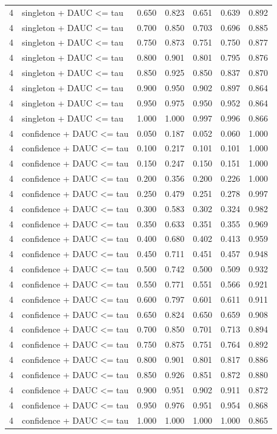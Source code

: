 \begin{tabular}{rlrrrrr}
4 & singleton + DAUC <= tau & 0.650 & 0.823 & 0.651 & 0.639 & 0.892 \\
4 & singleton + DAUC <= tau & 0.700 & 0.850 & 0.703 & 0.696 & 0.885 \\
4 & singleton + DAUC <= tau & 0.750 & 0.873 & 0.751 & 0.750 & 0.877 \\
4 & singleton + DAUC <= tau & 0.800 & 0.901 & 0.801 & 0.795 & 0.876 \\
4 & singleton + DAUC <= tau & 0.850 & 0.925 & 0.850 & 0.837 & 0.870 \\
4 & singleton + DAUC <= tau & 0.900 & 0.950 & 0.902 & 0.897 & 0.864 \\
4 & singleton + DAUC <= tau & 0.950 & 0.975 & 0.950 & 0.952 & 0.864 \\
4 & singleton + DAUC <= tau & 1.000 & 1.000 & 0.997 & 0.996 & 0.866 \\
4 & confidence + DAUC <= tau & 0.050 & 0.187 & 0.052 & 0.060 & 1.000 \\
4 & confidence + DAUC <= tau & 0.100 & 0.217 & 0.101 & 0.101 & 1.000 \\
4 & confidence + DAUC <= tau & 0.150 & 0.247 & 0.150 & 0.151 & 1.000 \\
4 & confidence + DAUC <= tau & 0.200 & 0.356 & 0.200 & 0.226 & 1.000 \\
4 & confidence + DAUC <= tau & 0.250 & 0.479 & 0.251 & 0.278 & 0.997 \\
4 & confidence + DAUC <= tau & 0.300 & 0.583 & 0.302 & 0.324 & 0.982 \\
4 & confidence + DAUC <= tau & 0.350 & 0.633 & 0.351 & 0.355 & 0.969 \\
4 & confidence + DAUC <= tau & 0.400 & 0.680 & 0.402 & 0.413 & 0.959 \\
4 & confidence + DAUC <= tau & 0.450 & 0.711 & 0.451 & 0.457 & 0.948 \\
4 & confidence + DAUC <= tau & 0.500 & 0.742 & 0.500 & 0.509 & 0.932 \\
4 & confidence + DAUC <= tau & 0.550 & 0.771 & 0.551 & 0.566 & 0.921 \\
4 & confidence + DAUC <= tau & 0.600 & 0.797 & 0.601 & 0.611 & 0.911 \\
4 & confidence + DAUC <= tau & 0.650 & 0.824 & 0.650 & 0.659 & 0.908 \\
4 & confidence + DAUC <= tau & 0.700 & 0.850 & 0.701 & 0.713 & 0.894 \\
4 & confidence + DAUC <= tau & 0.750 & 0.875 & 0.751 & 0.764 & 0.892 \\
4 & confidence + DAUC <= tau & 0.800 & 0.901 & 0.801 & 0.817 & 0.886 \\
4 & confidence + DAUC <= tau & 0.850 & 0.926 & 0.851 & 0.872 & 0.880 \\
4 & confidence + DAUC <= tau & 0.900 & 0.951 & 0.902 & 0.911 & 0.872 \\
4 & confidence + DAUC <= tau & 0.950 & 0.976 & 0.951 & 0.954 & 0.868 \\
4 & confidence + DAUC <= tau & 1.000 & 1.000 & 1.000 & 1.000 & 0.865 \\
\bottomrule
\end{tabular}
